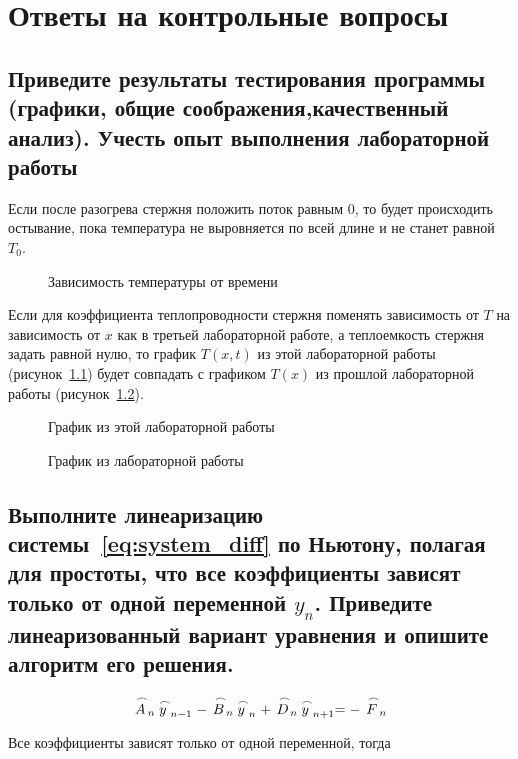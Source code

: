 \chapter{Ответы на контрольные вопросы}

\section{Приведите результаты тестирования программы (графики, общие соображения,качественный анализ). Учесть опыт выполнения лабораторной работы }

Если после разогрева стержня положить поток равным 0, то будет происходить остывание, пока температура не выровняется по всей длине и не станет равной $T_0$.
\begin{figure}[H]
    \caption{Зависимость температуры от времени}
    
\end{figure}

Если для коэффициента теплопроводности стержня поменять зависимость от $T$ на зависимость от $x$ как в третьей лабораторной работе, а теплоемкость стержня задать равной нулю, то график $T(x, t)$ из этой лабораторной работы (рисунок~\ref{img:lab_04}) будет совпадать с графиком $T(x)$ из прошлой лабораторной работы (рисунок~\ref{img:lab_03}).
\begin{figure}[H]
    \caption{График из этой лабораторной работы}\label{img:lab_04}
    
\end{figure}
\begin{figure}[H]
    \caption{График из лабораторной работы }\label{img:lab_03}
    
\end{figure}

\section{Выполните линеаризацию системы~\ref{eq:system_diff} по Ньютону, полагая для простоты, что все коэффициенты зависят только от одной переменной $y_n$. Приведите линеаризованный вариант уравнения и опишите алгоритм его решения.}

\begin{equation*}
        \LittleCap{A}_n \LittleCap{y}_{n-1} - \LittleCap{B}_n \LittleCap{y}_n + \LittleCap{D}_n \LittleCap{y}_{n+1} = -\LittleCap{F}_n
    \end{equation*}

    Все коэффициенты зависят только от одной переменной, тогда


